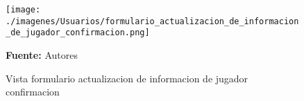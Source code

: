 \begin{figure}[!htb]
  \begin{center}
\texttt{[image: ./imagenes/Usuarios/formulario\_actualizacion\_de\_informacion\_de\_jugador\_confirmacion.png]}
    \caption{Vista formulario actualizacion de informacion de jugador confirmacion}
    \label{fig:Vista_formulario_actualizacion_de_informacion_de_jugador_confirmacion}
    \textbf{Fuente:}  Autores
  \end{center}
\end{figure}
